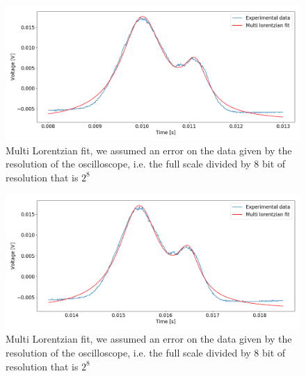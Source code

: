 \documentclass[a4paper,10pt]{article}
\begin{document}
\begin{figure}[H]
\centering
\includegraphics[width=\textwidth]{fit.png}
\caption{Multi Lorentzian fit, we assumed an error on the data given by the resolution of the oscilloscope, i.e. the full scale divided by 8 bit of resolution that is $2^8$}\label{fit}
\end{figure}
\begin{figure}[H]
\centering
\includegraphics[width=\textwidth]{fit2.png}
\caption{Multi Lorentzian fit, we assumed an error on the data given by the resolution of the oscilloscope, i.e. the full scale divided by 8 bit of resolution that is $2^8$}\label{fit2}
\end{figure}
\end{document}
